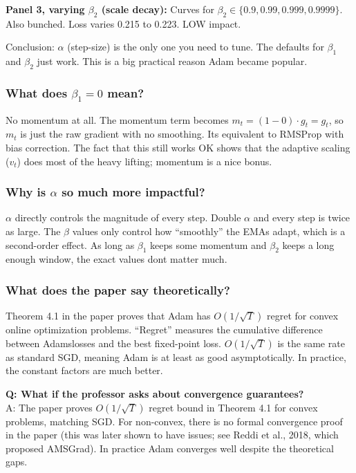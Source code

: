 \documentclass[11pt, letterpaper]{article}
\begin{document}
\textbf{Panel 3, varying $\beta_2$ (scale decay):} Curves for $\beta_2 \in \{0.9, 0.99, 0.999, 0.9999\}$. Also bunched. Loss varies 0.215 to 0.223. LOW impact.

Conclusion: $\alpha$ (step-size) is the only one you need to tune. The defaults for $\beta_1$ and $\beta_2$ just work. This is a big practical reason Adam became popular.

\begin{deepdive}
\subsubsection{What does $\beta_1 = 0$ mean?}
No momentum at all. The momentum term becomes $m_t = (1-0) \cdot g_t = g_t$, so $m_t$ is just the raw gradient with no smoothing. Its equivalent to RMSProp with bias correction. The fact that this still works OK shows that the adaptive scaling ($v_t$) does most of the heavy lifting; momentum is a nice bonus.

\subsubsection{Why is $\alpha$ so much more impactful?}
$\alpha$ directly controls the magnitude of every step. Double $\alpha$ and every step is twice as large. The $\beta$ values only control how ``smoothly'' the EMAs adapt, which is a second-order effect. As long as $\beta_1$ keeps some momentum and $\beta_2$ keeps a long enough window, the exact values dont matter much.

\subsubsection{What does the paper say theoretically?}
Theorem 4.1 in the paper proves that Adam has $O(1/\sqrt{T})$ regret for convex online optimization problems. ``Regret'' measures the cumulative difference between Adamslosses and the best fixed-point loss. $O(1/\sqrt{T})$ is the same rate as standard SGD, meaning Adam is at least as good asymptotically. In practice, the constant factors are much better.
\end{deepdive}

\begin{qabox}
\textbf{Q: What if the professor asks about convergence guarantees?}\\
A: The paper proves $O(1/\sqrt{T})$ regret bound in Theorem 4.1 for convex problems, matching SGD. For non-convex, there is no formal convergence proof in the paper (this was later shown to have issues; see Reddi et al., 2018, which proposed AMSGrad). In practice Adam converges well despite the theoretical gaps.
\end{qabox}
\end{document}
